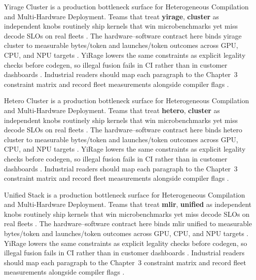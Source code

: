 Yirage Cluster is a production bottleneck surface for Heterogeneous Compilation and Multi-Hardware Deployment. Teams that treat \textbf{yirage}, \textbf{cluster} as independent knobs routinely ship kernels that win microbenchmarks yet miss decode SLOs on real fleets \citep{nvidia2022hopper,amd2024aie}. The hardware--software contract here binds yirage cluster to measurable bytes/token and launches/token outcomes across GPU, CPU, and NPU targets \citep{semianalysis2024tma,dlbook}. YiRage lowers the same constraints as explicit legality checks before codegen, so illegal fusion fails in CI rather than in customer dashboards \citep{amd2024xdna,dao2022flashattention}. Industrial readers should map each paragraph to the Chapter~3 constraint matrix and record fleet measurements alongside compiler flags \citep{amd2024aie,kwon2023vllm}.

Hetero Cluster is a production bottleneck surface for Heterogeneous Compilation and Multi-Hardware Deployment. Teams that treat \textbf{hetero}, \textbf{cluster} as independent knobs routinely ship kernels that win microbenchmarks yet miss decode SLOs on real fleets \citep{semianalysis2024tma,dlbook}. The hardware--software contract here binds hetero cluster to measurable bytes/token and launches/token outcomes across GPU, CPU, and NPU targets \citep{amd2024xdna,dao2022flashattention}. YiRage lowers the same constraints as explicit legality checks before codegen, so illegal fusion fails in CI rather than in customer dashboards \citep{amd2024aie,kwon2023vllm}. Industrial readers should map each paragraph to the Chapter~3 constraint matrix and record fleet measurements alongside compiler flags \citep{dlbook,nvidia2024cudagraphs}.

Unified Stack is a production bottleneck surface for Heterogeneous Compilation and Multi-Hardware Deployment. Teams that treat \textbf{mlir}, \textbf{unified} as independent knobs routinely ship kernels that win microbenchmarks yet miss decode SLOs on real fleets \citep{amd2024xdna,dao2022flashattention}. The hardware--software contract here binds mlir unified to measurable bytes/token and launches/token outcomes across GPU, CPU, and NPU targets \citep{amd2024aie,kwon2023vllm}. YiRage lowers the same constraints as explicit legality checks before codegen, so illegal fusion fails in CI rather than in customer dashboards \citep{dlbook,nvidia2024cudagraphs}. Industrial readers should map each paragraph to the Chapter~3 constraint matrix and record fleet measurements alongside compiler flags \citep{dao2022flashattention,liu2024deepseekv3}.

